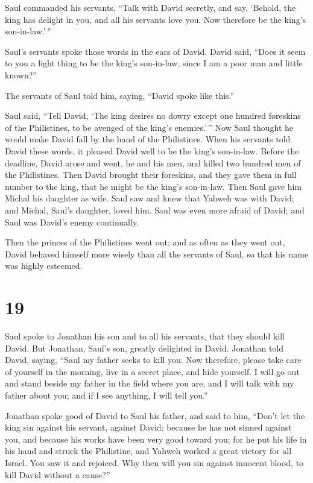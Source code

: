  Saul commanded his servants, ``Talk with David secretly,
and say, `Behold, the king has delight in you, and all his servants love
you. Now therefore be the king's son-in-law.'\,''

 Saul's servants spoke those words in the ears of David.
David said, ``Does it seem to you a light thing to be the king's
son-in-law, since I am a poor man and little known?''

 The servants of Saul told him, saying, ``David spoke like
this.''

 Saul said, ``Tell David, `The king desires no dowry except
one hundred foreskins of the Philistines, to be avenged of the king's
enemies.'\,'' Now Saul thought he would make David fall by the hand of
the Philistines.  When his servants told David these words,
it pleased David well to be the king's son-in-law. Before the deadline,
 David arose and went, he and his men, and killed two
hundred men of the Philistines. Then David brought their foreskins, and
they gave them in full number to the king, that he might be the king's
son-in-law. Then Saul gave him Michal his daughter as wife.
 Saul saw and knew that Yahweh was with David; and Michal,
Saul's daughter, loved him.  Saul was even more afraid of
David; and Saul was David's enemy continually.

 Then the princes of the Philistines went out; and as often
as they went out, David behaved himself more wisely than all the
servants of Saul, so that his name was highly esteemed.

\hypertarget{section-18}{%
\section{19}\label{section-18}}

 Saul spoke to Jonathan his son and to all his servants,
that they should kill David. But Jonathan, Saul's son, greatly delighted
in David.  Jonathan told David, saying, ``Saul my father
seeks to kill you. Now therefore, please take care of yourself in the
morning, live in a secret place, and hide yourself.  I will
go out and stand beside my father in the field where you are, and I will
talk with my father about you; and if I see anything, I will tell you.''

 Jonathan spoke good of David to Saul his father, and said
to him, ``Don't let the king sin against his servant, against David;
because he has not sinned against you, and because his works have been
very good toward you;  for he put his life in his hand and
struck the Philistine, and Yahweh worked a great victory for all Israel.
You saw it and rejoiced. Why then will you sin against innocent blood,
to kill David without a cause?''

